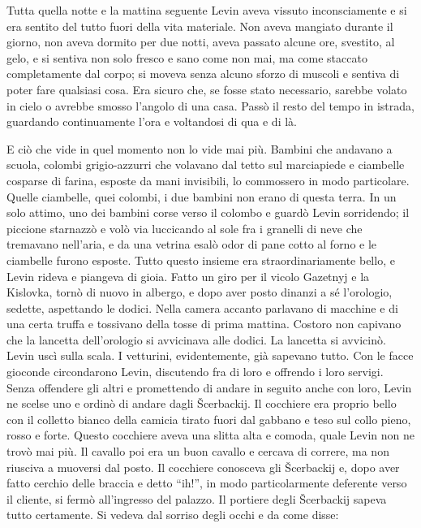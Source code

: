 Tutta quella notte e la mattina seguente Levin aveva vissuto inconsciamente e si era sentito del tutto fuori della vita materiale. Non aveva mangiato durante il giorno, non aveva dormito per due notti, aveva passato alcune ore, svestito, al gelo, e si sentiva non solo fresco e sano come non mai, ma come staccato completamente dal corpo; si moveva senza alcuno sforzo di muscoli e sentiva di poter fare qualsiasi cosa. Era sicuro che, se fosse stato necessario, sarebbe volato in cielo o avrebbe smosso l'angolo di una casa. Passò il resto del tempo in istrada, guardando continuamente l'ora e voltandosi di qua e di là. 

E ciò che vide in quel momento non lo vide mai più. Bambini che andavano a scuola, colombi grigio-azzurri che volavano dal tetto sul marciapiede e ciambelle cosparse di farina, esposte da mani invisibili, lo commossero in modo particolare. Quelle ciambelle, quei colombi, i due bambini non erano di questa terra. In un solo attimo, uno dei bambini corse verso il colombo e guardò Levin sorridendo; il piccione starnazzò e volò via luccicando al sole fra i granelli di neve che tremavano nell'aria, e da una vetrina esalò odor di pane cotto al forno e le ciambelle furono esposte. Tutto questo insieme era straordinariamente bello, e Levin rideva e piangeva di gioia. Fatto un giro per il vicolo Gazetnyj e la Kislovka, tornò di nuovo in albergo, e dopo aver posto dinanzi a sé l'orologio, sedette, aspettando le dodici. Nella camera accanto parlavano di macchine e di una certa truffa e tossivano della tosse di prima mattina. Costoro non capivano che la lancetta dell'orologio si avvicinava alle dodici. La lancetta si avvicinò. Levin uscì sulla scala. I vetturini, evidentemente, già sapevano tutto. Con le facce gioconde circondarono Levin, discutendo fra di loro e offrendo i loro servigi. Senza offendere gli altri e promettendo di andare in seguito anche con loro, Levin ne scelse uno e ordinò di andare dagli Šcerbackij. Il cocchiere era proprio bello con il colletto bianco della camicia tirato fuori dal gabbano e teso sul collo pieno, rosso e forte. Questo cocchiere aveva una slitta alta e comoda, quale Levin non ne trovò mai più. Il cavallo poi era un buon cavallo e cercava di correre, ma non riusciva a muoversi dal posto. Il cocchiere conosceva gli Šcerbackij e, dopo aver fatto cerchio delle braccia e detto ``ih!'', in modo particolarmente deferente verso il cliente, si fermò all'ingresso del palazzo. Il portiere degli Šcerbackij sapeva tutto certamente. Si vedeva dal sorriso degli occhi e da come disse: 

